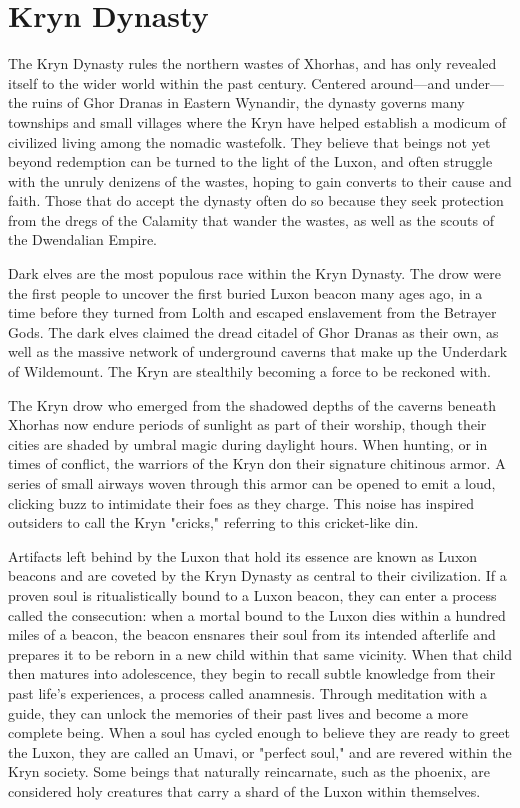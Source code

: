 \documentclass[10pt,a4paper,twoside,bg=print,twocolumn,openany,nodeprecatedcode]{dndbook}
\begin{document}
\section{Kryn Dynasty}
The Kryn Dynasty rules the northern wastes of Xhorhas, and has only revealed itself to the wider world within the past century. Centered around—and under—the ruins of Ghor Dranas in Eastern Wynandir, the dynasty governs many townships and small villages where the Kryn have helped establish a modicum of civilized living among the nomadic wastefolk. They believe that beings not yet beyond redemption can be turned to the light of the Luxon, and often struggle with the unruly denizens of the wastes, hoping to gain converts to their cause and faith. Those that do accept the dynasty often do so because they seek protection from the dregs of the Calamity that wander the wastes, as well as the scouts of the Dwendalian Empire.

Dark elves are the most populous race within the Kryn Dynasty. The drow were the first people to uncover the first buried Luxon beacon many ages ago, in a time before they turned from Lolth and escaped enslavement from the Betrayer Gods. The dark elves claimed the dread citadel of Ghor Dranas as their own, as well as the massive network of underground caverns that make up the Underdark of Wildemount. The Kryn are stealthily becoming a force to be reckoned with.

The Kryn drow who emerged from the shadowed depths of the caverns beneath Xhorhas now endure periods of sunlight as part of their worship, though their cities are shaded by umbral magic during daylight hours. When hunting, or in times of conflict, the warriors of the Kryn don their signature chitinous armor. A series of small airways woven through this armor can be opened to emit a loud, clicking buzz to intimidate their foes as they charge. This noise has inspired outsiders to call the Kryn "cricks," referring to this cricket-like din.

Artifacts left behind by the Luxon that hold its essence are known as Luxon beacons and are coveted by the Kryn Dynasty as central to their civilization. If a proven soul is ritualistically bound to a Luxon beacon, they can enter a process called the consecution: when a mortal bound to the Luxon dies within a hundred miles of a beacon, the beacon ensnares their soul from its intended afterlife and prepares it to be reborn in a new child within that same vicinity. When that child then matures into adolescence, they begin to recall subtle knowledge from their past life's experiences, a process called anamnesis. Through meditation with a guide, they can unlock the memories of their past lives and become a more complete being. When a soul has cycled enough to believe they are ready to greet the Luxon, they are called an Umavi, or "perfect soul," and are revered within the Kryn society. Some beings that naturally reincarnate, such as the phoenix, are considered holy creatures that carry a shard of the Luxon within themselves.
\end{document}

